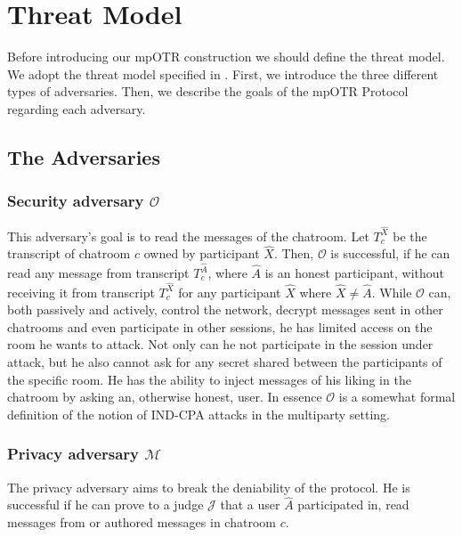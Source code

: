\chapter{Threat Model}
\label{chapter:threat_model}

\newcommand{\secadv}{$\mathcal{O}$ }
\newcommand{\privadv}{$\mathcal{M}$ }
\newcommand{\conadv}{$\mathcal{T}$ }

Before introducing our mpOTR construction we should define the threat model. We adopt the threat model specified in \cite{mpotr}. First, we introduce the three different types of adversaries. Then, we describe the goals of the mpOTR Protocol regarding each adversary.

\section{The Adversaries}

\subsection{Security adversary $\mathcal{O}$}
This adversary's goal is to read the messages of the chatroom.
Let $T_c^{\hat{X}}$ be the transcript of chatroom $c$ owned by participant $\hat{X}$.
Then, $\mathcal{O}$ is successful, if he can read any message from transcript $T_c^{\hat{A}}$, where $\hat{A}$ is an honest participant, without receiving it from transcript $T_c^{\hat{X}}$ for any participant $\hat{X}$ where $\hat{X} \ne \hat{A}$.
While $\mathcal{O}$ can, both passively and actively, control the network, decrypt messages sent in other chatrooms and even participate in other sessions, he has limited access on the room he wants to attack.
Not only can he not participate in the session under attack, but he also cannot ask for any secret shared between the participants of the specific room.
He has the ability to inject messages of his liking in the chatroom by asking an, otherwise honest, user.
In essence $\mathcal{O}$ is a somewhat formal definition of the notion of IND-CPA attacks in the multiparty setting.

\subsection{Privacy adversary $\mathcal{M}$}

The privacy adversary aims to break the deniability of the protocol.
He is successful if he can prove to a judge $\mathcal{J}$ that a user $\hat{A}$ participated in, read messages from or authored messages in chatroom $c$.

